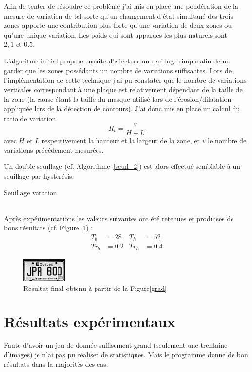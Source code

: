 \documentclass[a4paper,10pt,twocolumn]{article}
\begin{document}
Afin de tenter de résoudre ce problème j'ai mis en place une pondération de la mesure de variation de tel sorte qu'un changement d'état simultané des trois zones apporte une contribution plus forte qu'une variation de deux zones ou qu'une unique variation. Les poids qui sont apparues les plus naturels sont $2, 1 \text{ et } 0.5$.

L'algoritme initial propose ensuite d'effectuer un seuillage simple afin de ne garder que les zones possédants un nombre de variations suffisantes. Lors de l'implémentation de cette technique j'ai pu constater que le nombre de variations verticales correspondant à une plaque est relativement dépendant de la taille de la zone (la cause étant la taille du masque utilisé lors de l'érosion/dilatation appliquée lors de la détection de contours). J'ai donc mis en place un calcul du ratio de variation
\begin{equation}
  R_v = \frac{v}{H+L}
\end{equation}
avec $H \text{ et } L$ respectivement la hauteur et la largeur de la zone, et $v$ le nombre de variations précédement mesurées.

Un double seuillage (cf. Algorithme~\ref{seuil_2}) est alors effectué semblable à un seuillage par hystérésis.
\begin{algorithm} 
	\caption{Seuillage varation\label{seuil_2}}
	
\end{algorithm}\\
Après expérimentations les valeurs suivantes ont été retenues et produises de bons résultats (cf. Figure~\ref{plate}) :
\begin{align*}
  T_b &= 28 &T_h &= 52\\
  Tr_b &= 0.2 &Tr_h &= 0.4
\end{align*}
\begin{figure}[H]
	\centering 
	  \includegraphics{img/plate.png}
	\caption{Resultat final obtenu à partir de la Figure\ref{grad}\label{plate}}
\end{figure}

\section{Résultats expérimentaux}
Faute d'avoir un jeu de donnée suffisement grand (seulement une trentaine d'images) je n'ai pas pu réaliser de statistiques. Mais le programme donne de bon résultats dans la majorités des cas.
\end{document}
